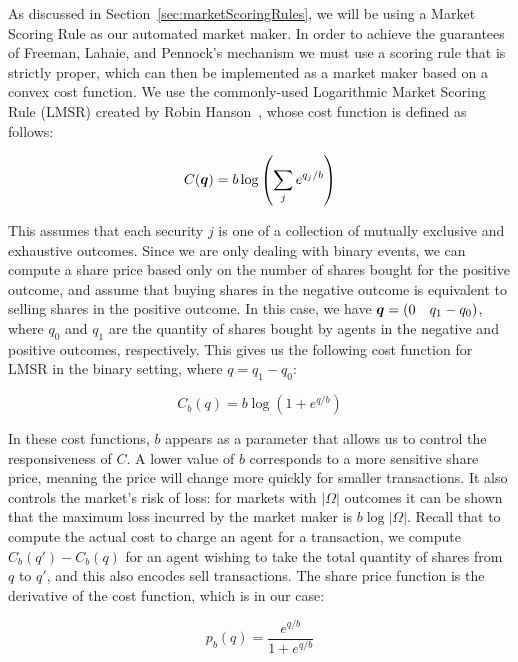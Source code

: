 As discussed in Section~\ref{sec:marketScoringRules}, we will be using a Market
Scoring Rule as our automated market maker. In order to achieve the guarantees
of Freeman, Lahaie, and Pennock's mechanism we must use a scoring rule that is
strictly proper, which can then be implemented as a market maker based on a
convex cost function. We use the commonly-used Logarithmic Market Scoring Rule
(LMSR) created by Robin Hanson~\cite{Hanson2007}, whose cost function is
defined as follows:

\begin{equation}
	\label{eq:LMSR}
	C(\bm{q}) = b \log \left( \sum_j e^{q_j/b} \right)
\end{equation}

This assumes that each security $j$ is one of a collection of mutually
exclusive and exhaustive outcomes. Since we are only dealing with binary
events, we can compute a share price based only on the number of shares bought
for the positive outcome, and assume that buying shares in the negative outcome
is equivalent to selling shares in the positive outcome. In this case, we have
$\bm{q}=( 0 \quad q_1 - q_0 )$, where $q_0$ and $q_1$ are the quantity of
shares bought by agents in the negative and positive outcomes, respectively.
This gives us the following cost function for LMSR in the binary setting, where
$q=q_1-q_0$:

\begin{equation}
	\label{eq:LMSRbinary}
	C_b (q) = b \log (1 + e^{q/b})
\end{equation}

In these cost functions, $b$ appears as a parameter that allows us to control
the responsiveness of $C$. A lower value of $b$ corresponds to a more sensitive
share price, meaning the price will change more quickly for smaller
transactions. It also controls the market's risk of loss: for markets with
$|\Omega|$ outcomes it can be shown that the maximum loss incurred by the
market maker is $b \log |\Omega|$. Recall that to compute the actual cost to
charge an agent for a transaction, we compute $C_b(q')-C_b(q)$ for an agent
wishing to take the total quantity of shares from $q$ to $q'$, and this also
encodes sell transactions. The share price function is the derivative of the
cost function, which is in our case:

\begin{equation}
	\label{eq:LMSRprice}
	p_b(q) = \frac{e^{q/b}}{1+e^{q/b}}
\end{equation}

